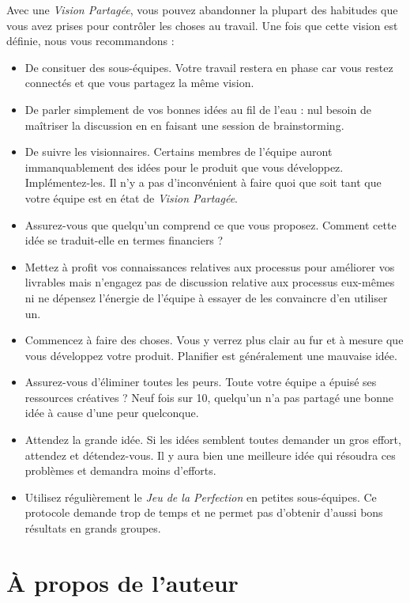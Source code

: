 \documentclass[paper=6in:9in,pagesize=pdftex,headinclude=on,footinclude=on,12pt]{scrbook}
\makeatletter
\newcommand\mynobreakpar{\par\nobreak\@afterheading}
\makeatother
\begin{document}
Avec une \emph{Vision Partagée}, vous pouvez abandonner la plupart des habitudes que vous avez prises pour
contrôler les choses au travail. Une fois que cette vision est définie, nous vous recommandons :\mynobreakpar
\begin{itemize}
	\item De consituer des sous-équipes. Votre travail restera en phase car vous restez connectés et que
	      vous partagez la même vision.
	\item De parler simplement de vos bonnes idées au fil de l'eau : nul besoin de maîtriser la discussion
	      en en faisant une session de \og{}brainstorming\fg{}.
	\item De suivre les visionnaires. Certains membres de l'équipe auront immanquablement des idées pour
	      le produit que vous développez. Implémentez-les. Il n'y a pas d'inconvénient à faire quoi que soit
	      tant que votre équipe est en état de \emph{Vision Partagée}.
	\item Assurez-vous que quelqu'un comprend ce que vous proposez. Comment cette idée se traduit-elle en
	      termes financiers ?
	\item Mettez à profit vos connaissances relatives aux processus pour améliorer vos livrables mais
	      n'engagez pas de discussion relative aux processus eux-mêmes ni ne dépensez l'énergie de l'équipe
	      à essayer de les convaincre d'en utiliser un.
	\item Commencez à faire des choses. Vous y verrez plus clair au fur et à mesure que vous développez
	      votre produit. \og{}Planifier\fg{} est généralement une mauvaise idée.
	\item Assurez-vous d'éliminer toutes les peurs. Toute votre équipe a épuisé ses ressources créatives ?
	      Neuf fois sur 10, quelqu'un n'a pas partagé une bonne idée à cause d'une peur quelconque.
	\item Attendez la grande idée. Si les idées semblent toutes demander un gros effort, attendez et
	      détendez-vous. Il y aura bien une meilleure idée qui résoudra ces problèmes et demandra
	      moins d'efforts.
	\item Utilisez régulièrement le \emph{Jeu de la Perfection} en petites sous-équipes. Ce protocole
	      demande trop de temps et ne permet pas d'obtenir d'aussi bons résultats en grands groupes.
\end{itemize}

\chapter*{À propos de l'auteur}
\end{document}

